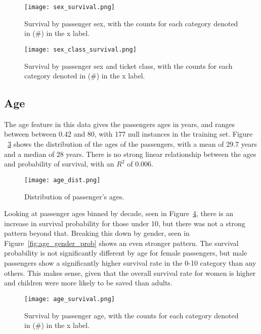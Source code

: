 \documentclass[12pt, letterpaper]{article}
\begin{document}
\begin{figure}[H]
    \centering
    \texttt{[image: sex\_survival.png]}
    \caption{Survival by passenger sex, with the counts for each category denoted in (\#) in the x label. }
    \label{fig:sex_prob}
\end{figure}

\begin{figure}[H]
    \centering
    \texttt{[image: sex\_class\_survival.png]}
    \caption{Survival by passenger sex and ticket class, with the counts for each category denoted in (\#) in the x label. }
    \label{fig:sex_class_prob}
\end{figure}

\subsection{Age}

The age feature in this data gives the passengers ages in years, and ranges between between 0.42 and 80, with 177 null instances in the training set. Figure ~\ref{fig:age_dist} shows the distribution of the ages of the passengers, with a mean of 29.7 years and a median of 28 years. There is no strong linear relationship between the ages and probability of survival, with an \(R^2\) of 0.006.

\begin{figure}[H]
    \centering
    \texttt{[image: age\_dist.png]}
    \caption{Distribution of passenger's ages.}
    \label{fig:age_dist}
\end{figure}

Looking at passenger ages binned by decade, seen in Figure~\ref{fig:age_prob}, there is an increase in survival probability for those under 10, but there was not a strong pattern beyond that. Breaking this down by gender, seen in Figure~\ref{fig:age_gender_prob} shows an even stronger pattern. The survival probability is not significantly different by age for female passengers, but male passengers show a significantly higher survival rate in the 0-10 category than any others. This makes sense, given that the overall survival rate for women is higher and children were more likely to be saved than adults.

\begin{figure}[H]
    \centering
    \texttt{[image: age\_survival.png]}
    \caption{Survival by passenger age, with the counts for each category denoted in (\#) in the x label. }
    \label{fig:age_prob}
\end{figure}
\end{document}
